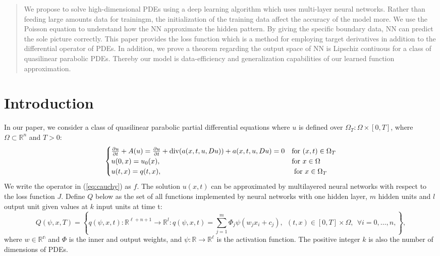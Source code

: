\documentclass{article}
\begin{document}
	\tableofcontents
\begin{abstract}
	We propose to solve high-dimensional PDEs using a deep learning algorithm which uses multi-layer neural networks. 
	Rather than feeding large amounts data for trainingm, the initialization of the training data affect the accuracy of the model more. 
	We use the Poisson equation to understand how the NN approximate the hidden pattern. 
	By giving the specific boundary data, NN can predict the sole picture correctly.
	This paper provides the loss function which is a method for employing  target derivatives in addition to the differential operator of PDEs. 
In addition, we prove a theorem regarding the output space of NN is Lipschiz contiuous  for a class of quasilinear parabolic PDEs.
Thereby our model is data-efficiency and
generalization capabilities of our learned function approximation.
\end{abstract}
	\section{Introduction}

	In our paper, we consider a class of quasilinear parabolic partial differential equations where $u$ is defined over $\Omega_T:\Omega\times [0,T]$, where $\Omega\subset\mathbb{R}^n $ and $T>0$:
	\begin{equation}
	\begin{cases}
 \frac{\partial u}{\partial t} +A(u) =\frac{\partial u}{\partial t}+{\rm div}(a(x,t,u,Du))+a(x,t,u,Du)=0 & \text{for $(x,t) \in \Omega_{T}$}\\
u(0,x) = u_{0}(x), & \text{for $x \in \Omega$} \\
u(t,x) = q(t,x), & \text{ for $x \in \Omega_{T}$} \\
	\end{cases}
	\label{eq:cauchy}
	\end{equation}
	We write the operator in (\ref{eq:cauchy}) as $f$. The solution $u(x,t)$ can be approximated by multilayered neural networks with respect to the loss function $J$.
Define $Q$ below as the set of all functions implemented by neural networks with one hidden layer, $m$ hidden units and $\textit{l}$ output unit given values at $k$ input units at time t:
	\begin{equation}
	Q(\psi,x,T)=\left \lbrace q(\psi,x,t): \mathbb{R}^{\ell+n+1} \rightarrow \mathbb{R}^{\textit{l}}:
q(\psi,x,t) = \sum_{j=1}^{m}\Phi_{j}\psi(w_{j}x_{i} + c_j ),\  \ (t,x) \in [0,T]\times \Omega, \ \ \forall i = 0, \dots, n ,  \right\rbrace,
	\label{eq:nn}
	\end{equation}
	where $w\in\mathbb{R^n}$ and $\Phi$ is the inner and output weights,
and $\psi:\mathbb{R}\to\mathbb{R^\ell}$ is the activation function.
The positive integer $k$ is also the number of dimensions of PDEs.
\end{document}
